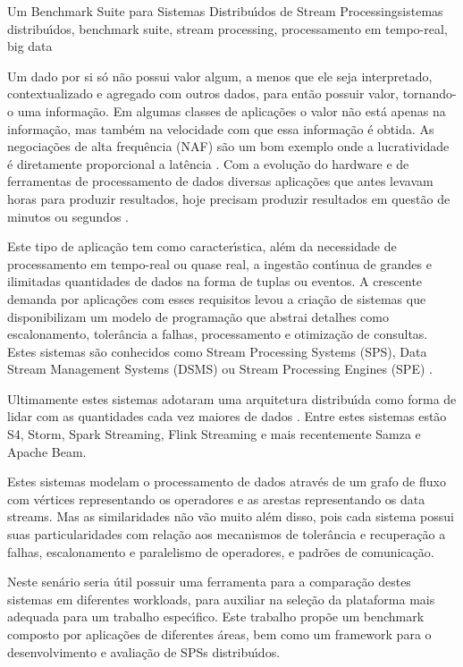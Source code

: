 \documentclass[ppgc,diss,english]{iiufrgs}
\begin{document}
\begin{englishabstract}{Um Benchmark Suite para Sistemas Distribu\'{\i}dos de Stream Processing}{sistemas distribu\'{\i}dos, benchmark suite, stream processing, processamento em tempo-real, big data}

Um dado por si s\'o n\~ao possui valor algum, a menos que ele seja interpretado, contextualizado e agregado com outros dados, para ent\~ao possuir valor, tornando-o uma informa\c{c}\~ao. Em algumas classes de aplica\c{c}\~oes o valor n\~ao est\'a apenas na informa\c{c}\~ao, mas tamb\'em na velocidade com que essa informa\c{c}\~ao \'e obtida. As negocia\c{c}\~oes de alta frequ\^encia (NAF) s\~ao um bom exemplo onde a lucratividade \'e diretamente proporcional a lat\^encia \cite{Loveless:2013:OAH:2507771.2507780}. Com a evolu\c{c}\~ao do hardware e de ferramentas de processamento de dados diversas aplica\c{c}\~oes que antes levavam horas para produzir resultados, hoje precisam produzir resultados em quest\~ao de minutos ou segundos \cite{barlow2013real}.

Este tipo de aplica\c{c}\~ao tem como caracter\'{\i}stica, al\'em da necessidade de processamento em tempo-real ou quase real, a ingest\~ao cont\'{\i}nua de grandes e ilimitadas quantidades de dados na forma de tuplas ou eventos. A crescente demanda por aplica\c{c}\~oes com esses requisitos levou a cria\c{c}\~ao de sistemas que disponibilizam um modelo de programa\c{c}\~ao que abstrai detalhes como escalonamento, toler\^ancia a falhas, processamento e otimiza\c{c}\~ao de consultas. Estes sistemas s\~ao conhecidos como Stream Processing Systems (SPS), Data Stream Management Systems (DSMS) \cite{chakravarthy2009stream} ou Stream Processing Engines (SPE) \cite{abadi2005design}.

Ultimamente estes sistemas adotaram uma arquitetura distribu\'{\i}da como forma de lidar com as quantidades cada vez maiores de dados \cite{zaharia2012discretized}. Entre estes sistemas est\~ao S4, Storm, Spark Streaming, Flink Streaming e mais recentemente Samza e Apache Beam.

Estes sistemas modelam o processamento de dados atrav\'es de um grafo de fluxo com v\'ertices representando os operadores e as arestas representando os data streams. Mas as similaridades n\~ao v\~ao muito al\'em disso, pois cada sistema possui suas particularidades com rela\c{c}\~ao aos mecanismos de toler\^ancia e recupera\c{c}\~ao a falhas, escalonamento e paralelismo de operadores, e padr\~oes de comunica\c{c}\~ao.

Neste sen\'ario seria \'util possuir uma ferramenta para a compara\c{c}\~ao destes sistemas em diferentes workloads, para auxiliar na sele\c{c}\~ao da plataforma mais adequada para um trabalho espec\'{\i}fico. Este trabalho prop\~oe um benchmark composto por aplica\c{c}\~oes de diferentes \'areas, bem como um framework para o desenvolvimento e avalia\c{c}\~ao de SPSs distribu\'{\i}dos.

\end{englishabstract}
\end{document}
